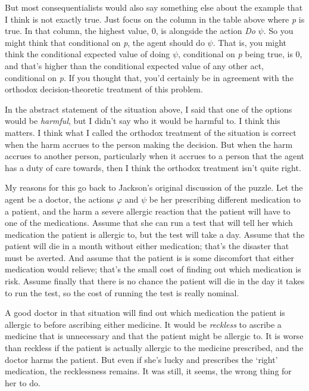 \documentclass[
  11pt,
  letterpaper,
  DIV=11,
  numbers=noendperiod,
  twoside]{scrartcl}
\begin{document}
But most consequentialists would also say something else about the
example that I think is not exactly true. Just focus on the column in
the table above where \emph{p} is true. In that column, the highest
value, 0, is alongside the action \emph{Do} \(\psi\). So you might think
that conditional on \emph{p}, the agent should do \(\psi\). That is, you
might think the conditional expected value of doing \(\psi\),
conditional on \emph{p} being true, is 0, and that's higher than the
conditional expected value of any other act, conditional on \emph{p}. If
you thought that, you'd certainly be in agreement with the orthodox
decision-theoretic treatment of this problem.

In the abstract statement of the situation above, I said that one of the
options would be \emph{harmful}, but I didn't say who it would be
harmful to. I think this matters. I think what I called the orthodox
treatment of the situation is correct when the harm accrues to the
person making the decision. But when the harm accrues to another person,
particularly when it accrues to a person that the agent has a duty of
care towards, then I think the orthodox treatment isn't quite right.

My reasons for this go back to Jackson's original discussion of the
puzzle. Let the agent be a doctor, the actions \(\varphi\) and \(\psi\)
be her prescribing different medication to a patient, and the harm a
severe allergic reaction that the patient will have to one of the
medications. Assume that she can run a test that will tell her which
medication the patient is allergic to, but the test will take a day.
Assume that the patient will die in a month without either medication;
that's the disaster that must be averted. And assume that the patient is
is some discomfort that either medication would relieve; that's the
small cost of finding out which medication is risk. Assume finally that
there is no chance the patient will die in the day it takes to run the
test, so the cost of running the test is really nominal.

A good doctor in that situation will find out which medication the
patient is allergic to before ascribing either medicine. It would be
\emph{reckless} to ascribe a medicine that is unnecessary and that the
patient might be allergic to. It is worse than reckless if the patient
is actually allergic to the medicine prescribed, and the doctor harms
the patient. But even if she's lucky and prescribes the `right'
medication, the recklessness remains. It was still, it seems, the wrong
thing for her to do.
\end{document}
